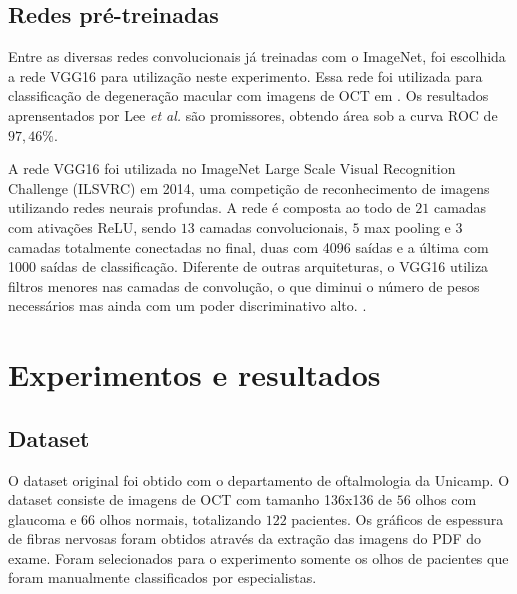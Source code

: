 \documentclass[conference]{IEEEtran}
\begin{document}
  \subsection{Redes pré-treinadas}


  Entre as diversas redes convolucionais já treinadas com o ImageNet, foi escolhida a rede VGG16 para utilização neste experimento. Essa rede foi utilizada para classificação de degeneração macular com imagens de OCT em \cite{lee2017}. Os resultados aprensentados por Lee \textit{et al.} são promissores, obtendo área sob a curva ROC de $97,46\%$.

  A rede VGG16 foi utilizada no ImageNet Large Scale Visual Recognition Challenge (ILSVRC) em 2014, uma competição de reconhecimento de imagens utilizando redes neurais profundas. A rede é composta ao todo de $21$ camadas com ativações ReLU, sendo $13$ camadas convolucionais, $5$ max pooling e $3$ camadas totalmente conectadas no final, duas com 4096 saídas e a última com 1000 saídas de classificação. Diferente de outras arquiteturas, o VGG16 utiliza filtros menores nas camadas de convolução, o que diminui o número de pesos necessários mas ainda com um poder discriminativo alto. \cite{simonyan2014}.

\section{Experimentos e resultados}



  \subsection{Dataset}


  O dataset original foi obtido com o departamento de oftalmologia da Unicamp. O dataset consiste de imagens de OCT com tamanho 136x136 de $56$ olhos com glaucoma e $66$ olhos normais, totalizando $122$ pacientes. Os gráficos de espessura de fibras nervosas foram obtidos através da extração das imagens do PDF do exame. Foram selecionados para o experimento somente os olhos de pacientes que foram manualmente classificados por especialistas.
\end{document}
